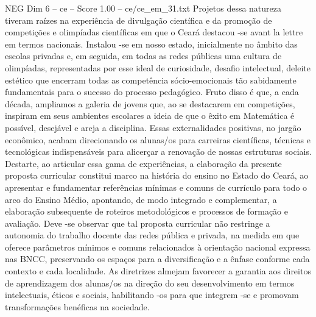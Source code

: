 \begin{textsample}{NEG Dim 6 – ce – Score 1.00 – ce/ce\_em\_31.txt}
Projetos dessa natureza tiveram raízes na experiência de divulgação científica e da promoção de competições e olimpíadas científicas em que o Ceará destacou -se avant la lettre em termos nacionais.
Instalou -se em nosso estado, inicialmente no âmbito das escolas privadas e, em seguida, em todas as redes públicas uma cultura de olimpíadas, representadas por esse ideal de curiosidade, desafio intelectual, deleite estético que encerram todas as competência sócio-emocionais tão sabidamente fundamentais para o sucesso do processo pedagógico.
Fruto disso é que, a cada década, ampliamos a galeria de jovens que, ao se destacarem em competições, inspiram em seus ambientes escolares a ideia de que o êxito em Matemática é possível, desejável e areja a disciplina.
Essas externalidades positivas, no jargão econômico, acabam direcionando os alunas/os para carreiras científicas, técnicas e tecnológicas indispensáveis para alicerçar a renovação de nossas estruturas sociais.
Destarte, ao articular essa gama de experiências, a elaboração da presente proposta curricular constitui marco na história do ensino no Estado do Ceará, ao apresentar e fundamentar referências mínimas e comuns de currículo para todo o arco do Ensino Médio, apontando, de modo integrado e complementar, a elaboração subsequente de roteiros metodológicos e processos de formação e avaliação.
Deve -se observar que tal proposta curricular não restringe a autonomia do trabalho docente das redes pública e privada, na medida em que oferece parâmetros mínimos e comuns relacionados à orientação nacional expressa nas BNCC, preservando os espaços para a diversificação e a ênfase conforme cada contexto e cada localidade.
As diretrizes almejam favorecer a garantia aos direitos de aprendizagem dos alunas/os na direção do seu desenvolvimento em termos intelectuais, éticos e sociais, habilitando -os para que integrem -se e promovam transformações benéficas na sociedade.

\end{textsample}
